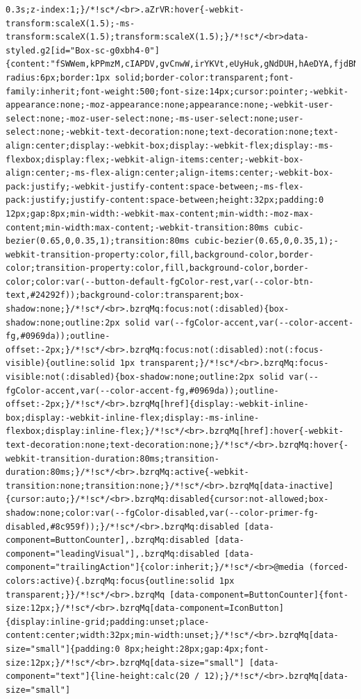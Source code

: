 \documentclass[
  letterpaper,
]{book}
\begin{document}
\begin{verbatim}
0.3s;z-index:1;}/*!sc*/<br>.aZrVR:hover{-webkit-transform:scaleX(1.5);-ms-transform:scaleX(1.5);transform:scaleX(1.5);}/*!sc*/<br>data-styled.g2[id="Box-sc-g0xbh4-0"]{content:"fSWWem,kPPmzM,cIAPDV,gvCnwW,irYKVt,eUyHuk,gNdDUH,hAeDYA,fjdBNx,emFMJu,hlUAHL,iStsmI,eIgvIk,eVFfWF,fywjmm,dyczTK,cpXcux,iPEkxH,kkrdEu,trpoQ,bKgizp,iPGYsi,dKmYfk,ehCeGn,eTvGbF,kzRgrI,cmAPIB,jwXCBK,gtBUEp,kfYOBR,hVZtwF,cMYnca,brJRqk,iJmJly,jACbi,gIJuDf,fleZSW,BnySK,VHzRk,ePiodO,kQJlnf,nSWSp,lhFvfi,doiYd,jKPiSV,iZJewz,jfjHXm,bfkNRF,fXBLEV,gMPsNT,iBylDf,kSGBPx,ytOJl,jWnGGx,TCenl,cluMzC,eRkHwF,knCTAx,aZrVR,"}/*!sc*/<br>.bzrqMq{border-radius:6px;border:1px solid;border-color:transparent;font-family:inherit;font-weight:500;font-size:14px;cursor:pointer;-webkit-appearance:none;-moz-appearance:none;appearance:none;-webkit-user-select:none;-moz-user-select:none;-ms-user-select:none;user-select:none;-webkit-text-decoration:none;text-decoration:none;text-align:center;display:-webkit-box;display:-webkit-flex;display:-ms-flexbox;display:flex;-webkit-align-items:center;-webkit-box-align:center;-ms-flex-align:center;align-items:center;-webkit-box-pack:justify;-webkit-justify-content:space-between;-ms-flex-pack:justify;justify-content:space-between;height:32px;padding:0 12px;gap:8px;min-width:-webkit-max-content;min-width:-moz-max-content;min-width:max-content;-webkit-transition:80ms cubic-bezier(0.65,0,0.35,1);transition:80ms cubic-bezier(0.65,0,0.35,1);-webkit-transition-property:color,fill,background-color,border-color;transition-property:color,fill,background-color,border-color;color:var(--button-default-fgColor-rest,var(--color-btn-text,#24292f));background-color:transparent;box-shadow:none;}/*!sc*/<br>.bzrqMq:focus:not(:disabled){box-shadow:none;outline:2px solid var(--fgColor-accent,var(--color-accent-fg,#0969da));outline-offset:-2px;}/*!sc*/<br>.bzrqMq:focus:not(:disabled):not(:focus-visible){outline:solid 1px transparent;}/*!sc*/<br>.bzrqMq:focus-visible:not(:disabled){box-shadow:none;outline:2px solid var(--fgColor-accent,var(--color-accent-fg,#0969da));outline-offset:-2px;}/*!sc*/<br>.bzrqMq[href]{display:-webkit-inline-box;display:-webkit-inline-flex;display:-ms-inline-flexbox;display:inline-flex;}/*!sc*/<br>.bzrqMq[href]:hover{-webkit-text-decoration:none;text-decoration:none;}/*!sc*/<br>.bzrqMq:hover{-webkit-transition-duration:80ms;transition-duration:80ms;}/*!sc*/<br>.bzrqMq:active{-webkit-transition:none;transition:none;}/*!sc*/<br>.bzrqMq[data-inactive]{cursor:auto;}/*!sc*/<br>.bzrqMq:disabled{cursor:not-allowed;box-shadow:none;color:var(--fgColor-disabled,var(--color-primer-fg-disabled,#8c959f));}/*!sc*/<br>.bzrqMq:disabled [data-component=ButtonCounter],.bzrqMq:disabled [data-component="leadingVisual"],.bzrqMq:disabled [data-component="trailingAction"]{color:inherit;}/*!sc*/<br>@media (forced-colors:active){.bzrqMq:focus{outline:solid 1px transparent;}}/*!sc*/<br>.bzrqMq [data-component=ButtonCounter]{font-size:12px;}/*!sc*/<br>.bzrqMq[data-component=IconButton]{display:inline-grid;padding:unset;place-content:center;width:32px;min-width:unset;}/*!sc*/<br>.bzrqMq[data-size="small"]{padding:0 8px;height:28px;gap:4px;font-size:12px;}/*!sc*/<br>.bzrqMq[data-size="small"] [data-component="text"]{line-height:calc(20 / 12);}/*!sc*/<br>.bzrqMq[data-size="small"] 
\end{verbatim}
\end{document}
